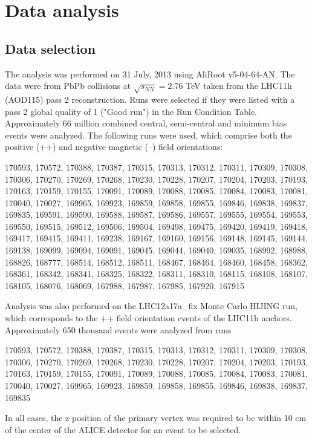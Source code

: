 \section{Data analysis}
\subsection{Data selection}
The analysis was performed on 31 July, 2013 using AliRoot v5-04-64-AN. The data were from PbPb collisions at $\sqrt{s_{NN}}=2.76$  TeV taken from the LHC11h (AOD115) pass 2 reconstruction. Runs were selected if they were listed with a pass 2 global quality of 1 ("Good run") in the Run Condition Table. Approximately 66 million combined central, semi-central and minimum bias events were analyzed. The following runs were used, which comprise both the positive (++) and negative magnetic (--) field orientations:

170593, 170572, 170388, 170387, 170315, 170313, 170312, 170311, 170309, 170308, 170306, 170270, 170269, 170268, 170230, 170228, 170207, 170204, 170203, 170193, 170163, 170159, 170155, 170091, 170089, 170088, 170085, 170084, 170083, 170081, 170040, 170027, 169965, 169923, 169859, 169858, 169855, 169846, 169838, 169837, 169835, 169591, 169590, 169588, 169587, 169586, 169557, 169555, 169554, 169553, 169550, 169515, 169512, 169506, 169504, 169498, 169475, 169420, 169419, 169418, 169417, 169415, 169411, 169238, 169167, 169160, 169156, 169148, 169145, 169144, 169138, 169099, 169094, 169091, 169045, 169044, 169040, 169035, 168992, 168988, 168826, 168777, 168514, 168512, 168511, 168467, 168464, 168460, 168458, 168362, 168361, 168342, 168341, 168325, 168322, 168311, 168310, 168115, 168108, 168107, 168105, 168076, 168069, 167988, 167987, 167985, 167920, 167915

Analysis was also performed on the LHC12a17a_fix Monte Carlo HIJING run, which corresponds to the ++ field orientation events of the LHC11h anchors.  Approximately 650 thousand events were analyzed from runs

170593, 170572, 170388, 170387, 170315, 170313, 170312, 170311, 170309, 170308, 170306, 170270, 170269, 170268, 170230, 170228, 170207, 170204, 170203, 170193, 170163, 170159, 170155, 170091, 170089, 170088, 170085, 170084, 170083, 170081, 170040, 170027, 169965, 169923, 169859, 169858, 169855, 169846, 169838, 169837, 169835

In all cases, the z-position of the primary vertex was required to be within 10 cm of the center of the ALICE detector for an event to be selected.  

